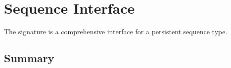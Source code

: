 \chapter{Sequence Interface}
\label{ch:seq-interface}
\begin{preamble}
The  signature is a comprehensive interface for a
persistent sequence type.
\end{preamble}

\section{Summary}
